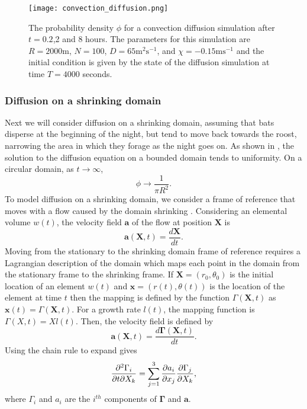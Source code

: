   \begin{figure} [t]
      \centering
          \texttt{[image: convection\_diffusion.png]}
          \caption{The probability density $\phi$ for a convection diffusion simulation after $t = 0.2$,2 and 8 hours. The parameters for this simulation are $R = 2000$m, $N = 100$,
          $D = 65\mathrm{m^2s^{-1}}$, and $\chi = - 0.15\mathrm{ms^{-1}}$ and the initial condition is given by the state of the diffusion simulation at time $T = 4000$ seconds.}
      \label{fig:convection_diffusion}
  \end{figure}


\subsubsection{Diffusion on a shrinking domain} \label{shrink}
 Next we will consider diffusion on a shrinking domain, assuming that bats disperse at the beginning of the night, but tend to move back towards the roost, narrowing the area in which they forage as the night goes on. As shown in , the solution to the diffusion equation on a bounded domain tends to uniformity. On a circular domain, as $t\rightarrow \infty$,
  \begin{equation}
  \phi \rightarrow \frac{1}{\pi R^2}.
  \label{eqn:uniform_circle}
  \end{equation}
 To model diffusion on a shrinking domain, we consider a frame of reference that moves with a flow caused by the domain shrinking \cite{crampinnonuniform}. Considering an elemental volume $w(t)$, the velocity field $\bm{a}$ of the flow at position $\bm{X}$ is
%
\begin{equation}
\bm{a}(\bm{X},t) = \frac{d\bm{X}}{dt}.
\end{equation}
%
Moving from the stationary to the shrinking domain frame of reference requires a Lagrangian description of the domain which maps each point in the domain from the stationary frame to the shrinking frame. If $\bm{X} = (r_0,\theta_0)$ is the initial location of an element $w(t)$ and $\bm{x} = (r(t),\theta(t))$ is the location of the element at time $t$ then the mapping is defined by the function $\Gamma(\bm{X},t) $ as $\bm{x}(t) =\Gamma(\bm{X},t) $. For a growth rate $l(t)$, the mapping function is $\Gamma(X,t) = Xl(t)$. Then, the velocity field is defined by
%
\begin{equation}
\bm{a}(\bm{X},t) = \frac{d\bm{\Gamma}(\bm{X},t)}{dt} .
\label{dgammadt}
\end{equation}
%
Using the chain rule to expand  gives
%
\begin{equation}
    \frac{\partial^2 \Gamma_i}{\partial t\partial X_k} = \sum_{j=1}^{3}\frac{\partial a_i}{\partial x_j}\frac{\partial \Gamma_j}{\partial X_k},
\end{equation}
%
where $\Gamma_i$ and $a_i$ are the $i^{th}$ components of $\bm{\Gamma}$ and $\bm{a}$.

